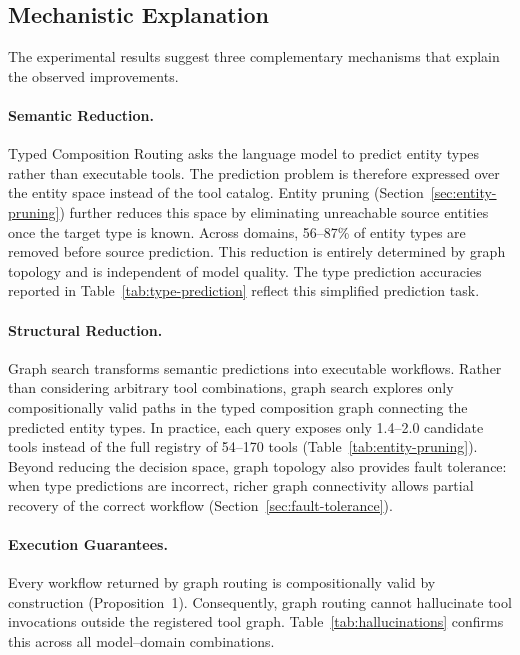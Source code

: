 \subsection{Mechanistic Explanation}
\label{sec:mechanistic}

The experimental results suggest three complementary mechanisms that explain the observed improvements.

\paragraph{Semantic Reduction.}

Typed Composition Routing asks the language model to predict entity types rather than executable tools.
The prediction problem is therefore expressed over the entity space instead of the tool catalog.
Entity pruning (Section~\ref{sec:entity-pruning}) further reduces this space by eliminating unreachable source entities once the target type is known.
Across domains, 56--87\% of entity types are removed before source prediction.
This reduction is entirely determined by graph topology and is independent of model quality.
The type prediction accuracies reported in Table~\ref{tab:type-prediction} reflect this simplified prediction task.

\paragraph{Structural Reduction.}

Graph search transforms semantic predictions into executable workflows.
Rather than considering arbitrary tool combinations, graph search explores only compositionally valid paths in the typed composition graph connecting the predicted entity types.
In practice, each query exposes only 1.4--2.0 candidate tools instead of the full registry of 54--170 tools (Table~\ref{tab:entity-pruning}).
Beyond reducing the decision space, graph topology also provides fault tolerance: when type predictions are incorrect, richer graph connectivity allows partial recovery of the correct workflow (Section~\ref{sec:fault-tolerance}).

\paragraph{Execution Guarantees.}

Every workflow returned by graph routing is compositionally valid by construction (Proposition~1).
Consequently, graph routing cannot hallucinate tool invocations outside the registered tool graph.
Table~\ref{tab:hallucinations} confirms this across all model--domain combinations.

